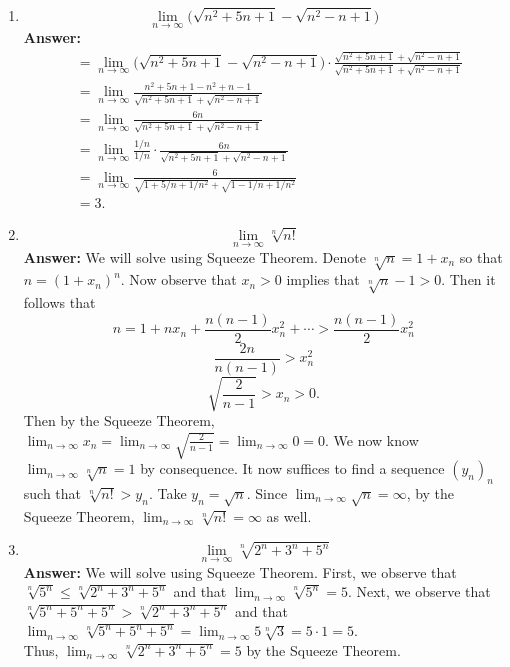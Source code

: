 \documentclass{article}
\begin{document}
\begin{enumerate}[label=\Roman*.]
\begin{enumerate}[label = \arabic*.]
            \item \[\lim_{n\to \infty} \Big(\sqrt{n^2+5n+1}-\sqrt{n^2-n+1}\Big)\]
            \textbf{Answer: }
            \begin{align*} 
                &= \lim_{n\to \infty} \Big(\sqrt{n^2+5n+1}-\sqrt{n^2-n+1}\Big) \cdot \frac{\sqrt{n^2+5n+1}+\sqrt{n^2-n+1}}{\sqrt{n^2+5n+1}+\sqrt{n^2-n+1}}\\
                &=\lim_{n\to \infty} \frac{n^2+5n+1-n^2+n-1}{\sqrt{n^2+5n+1}+\sqrt{n^2-n+1}}\\
                &=\lim_{n\to \infty} \frac{6n}{\sqrt{n^2+5n+1}+\sqrt{n^2-n+1}}\\
                &=\lim_{n\to \infty} \frac{1/n}{1/n} \cdot \frac{6n}{\sqrt{n^2+5n+1}+\sqrt{n^2-n+1}}\\
                &=\lim_{n\to \infty} \frac{6}{\sqrt{1+5/n +1/n^2}+\sqrt{1-1/n+1/n^2}}\\
                &= 3.
            \end{align*}            
            \item \[\lim_{n\to \infty} \sqrt[n]{n!}\]
            \textbf{Answer: }We will solve using Squeeze Theorem. Denote $\sqrt[n]{n} = 1+x_n$ so that $n = (1+x_n)^n$. Now observe that $x_n > 0$ implies that $\sqrt[n]{n}-1 > 0$. Then it follows that 
                \[n=1+nx_n+\frac{n(n-1)}{2}x_{n}^2+ \cdots > \frac{n(n-1)}{2}x_n^2\]
                \[\frac{2n}{n(n-1)} > x_n^2\]
                \[\sqrt{\frac{2}{n-1}} > x_n > 0.\]
            Then by the Squeeze Theorem, $\lim_{n \to \infty}x_n = \lim_{n \to \infty} \sqrt{\frac{2}{n-1}} = \lim_{n \to \infty}0 = 0$. We now know $\lim_{n \to \infty} \sqrt[n]{n} = 1$ by consequence. It now suffices to find a sequence $(y_n)_n$ such that $\sqrt[n]{n!} > y_n$. Take $y_n = \sqrt{n}$.  Since $\lim_{n \to \infty} \sqrt{n} = \infty$, by the Squeeze Theorem, $\lim_{n\to \infty} \sqrt[n]{n!} = \infty$ as well.\\
            
            \item \[\lim_{n\to \infty} \sqrt[n]{2^n+3^n+5^n}\]
            \textbf{Answer: }We will solve using Squeeze Theorem. First, we observe that $\sqrt[n]{5^n} \leq \sqrt[n]{2^n+3^n+5^n} $ and that $\lim_{n \to \infty} \sqrt[n]{5^n} = 5$. Next, we observe that $\sqrt[n]{5^n + 5^n + 5^n} > \sqrt[n]{2^n+3^n+5^n}$ and that $\lim_{n \to \infty} \sqrt[n]{5^n + 5^n + 5^n} = \lim_{n \to \infty} 5\sqrt[n]{3} = 5 \cdot 1 = 5$.\\
            Thus, $\lim_{n\to \infty} \sqrt[n]{2^n+3^n+5^n} = 5$ by the Squeeze Theorem.
            

\end{enumerate}
\end{enumerate}
\end{document}
